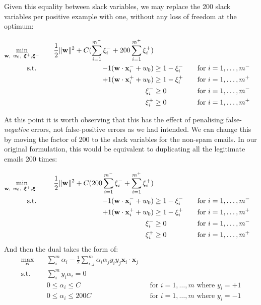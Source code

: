 Given this equality between slack variables, we may replace the 200 slack variables per positive example with one, without any loss of freedom at the optimum:

\begin{alignat*}{3}
  \min_{\mathbf{w},~w_0,~\boldsymbol\xi^+,\boldsymbol\xi^-}\quad&&\frac{1}{2}\lVert\mathbf{w}\rVert^2 + C(\sum_{i=1}^{m^-}\xi_i^-+200\sum_{i=1}^{m^+}\xi_i^+)\\
  \text{s.t. }\quad&&-1(\mathbf{w}\cdot\mathbf{x}_i^-+w_0) & \geq 1 - \xi_i^- &&\quad\text{for }i = 1,\ldots,m^-
  \\ &&+1(\mathbf{w}\cdot\mathbf{x}_i^++w_0) & \geq 1 - \xi_i^+ &&\quad\text{for }i = 1,\ldots,m^+
  \\ &&\xi_i^- & \geq 0 &&\quad\text{for }i=1,\ldots,m^-
  \\ &&\xi_i^+ & \geq 0 &&\quad\text{for }i=1,\ldots,m^+
\end{alignat*}

At this point it is worth observing that this has the effect of penalising false-\textit{negative} errors, not false-positive errors as we had intended. We can change this by moving the factor of 200 to the slack variables for the non-spam emails. In our original formulation, this would be equivalent to duplicating all the legitimate emails 200 times:

\begin{alignat*}{3}
  \min_{\mathbf{w},~w_0,~\boldsymbol\xi^+,\boldsymbol\xi^-}\quad&&\frac{1}{2}\lVert\mathbf{w}\rVert^2 + C(200\sum_{i=1}^{m^-}\xi_i^-+\sum_{i=1}^{m^+}\xi_i^+)\\
  \text{s.t. }\quad&&-1(\mathbf{w}\cdot\mathbf{x}_i^-+w_0) & \geq 1 - \xi_i^- &&\quad\text{for }i = 1,\ldots,m^-
  \\ &&+1(\mathbf{w}\cdot\mathbf{x}_i^++w_0) & \geq 1 - \xi_i^+ &&\quad\text{for }i = 1,\ldots,m^+
  \\ &&\xi_i^- & \geq 0 &&\quad\text{for }i=1,\ldots,m^-
  \\ &&\xi_i^+ & \geq 0 &&\quad\text{for }i=1,\ldots,m^+
\end{alignat*}
\noindent And then the dual takes the form of:
\begin{align*}
  \max_{\boldsymbol\alpha}\quad&\sum_{i}^m\alpha_i-\frac{1}{2}\sum_{i,j}^{m}\alpha_i\alpha_jy_iy_j\mathbf{x}_i\cdot\mathbf{x}_j\\
  \text{s.t.}\quad&\sum_i^my_i\alpha_i = 0
  \\ & 0\leq\alpha_i\leq C && \text{for }i=1,\ldots,m\text{ where }y_i=+1
  \\ & 0\leq\alpha_i\leq 200C &&\text{for }i=1,\ldots,m\text{ where }y_i=-1
\end{align*}


